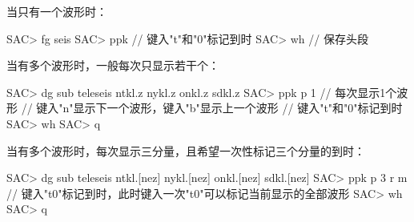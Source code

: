 当只有一个波形时：
\begin{SACCode}
SAC> fg seis
SAC> ppk
// 键入"t"和"0"标记到时
SAC> wh         // 保存头段
\end{SACCode}

当有多个波形时，一般每次只显示若干个：
\begin{SACCode}
SAC> dg sub teleseis ntkl.z nykl.z onkl.z sdkl.z
SAC> ppk p 1    // 每次显示1个波形
// 键入"n"显示下一个波形，键入"b"显示上一个波形
// 键入"t"和"0"标记到时
SAC> wh
SAC> q
\end{SACCode}

当有多个波形时，每次显示三分量，且希望一次性标记三个分量的到时：
\begin{SACCode}
SAC> dg sub teleseis ntkl.[nez] nykl.[nez] onkl.[nez] sdkl.[nez]
SAC> ppk p 3 r m
// 键入"t0"标记到时，此时键入一次"t0"可以标记当前显示的全部波形
SAC> wh
SAC> q
\end{SACCode}
